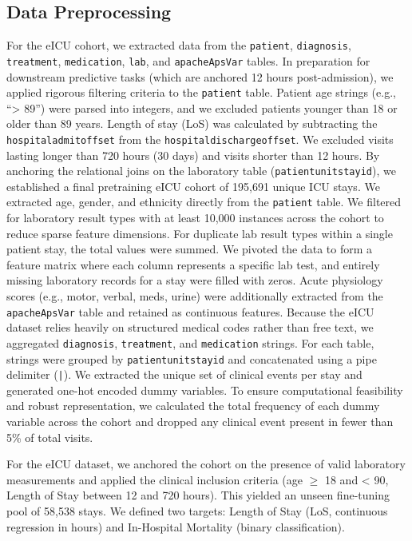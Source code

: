 \documentclass{article}
\begin{document}
\subsection{Data Preprocessing}
For the eICU cohort, we extracted data from the \texttt{patient}, \texttt{diagnosis}, \texttt{treatment}, \texttt{medication}, \texttt{lab}, and \texttt{apacheApsVar} tables. In preparation for downstream predictive tasks (which are anchored 12 hours post-admission), we applied rigorous filtering criteria to the \texttt{patient} table. Patient age strings (e.g., ``> 89'') were parsed into integers, and we excluded patients younger than 18 or older than 89 years. Length of stay (LoS) was calculated by subtracting the \texttt{hospitaladmitoffset} from the \texttt{hospitaldischargeoffset}. We excluded visits lasting longer than 720 hours (30 days) and visits shorter than 12 hours. By anchoring the relational joins on the laboratory table (\texttt{patientunitstayid}), we established a final pretraining eICU cohort of 195,691 unique ICU stays.
We extracted age, gender, and ethnicity directly from the \texttt{patient} table.
We filtered for laboratory result types with at least 10,000 instances across the cohort to reduce sparse feature dimensions. For duplicate lab result types within a single patient stay, the total values were summed. We pivoted the data to form a feature matrix where each column represents a specific lab test, and entirely missing laboratory records for a stay were filled with zeros. Acute physiology scores (e.g., motor, verbal, meds, urine) were additionally extracted from the \texttt{apacheApsVar} table and retained as continuous features.
Because the eICU dataset relies heavily on structured medical codes rather than free text, we aggregated \texttt{diagnosis}, \texttt{treatment}, and \texttt{medication} strings. For each table, strings were grouped by \texttt{patientunitstayid} and concatenated using a pipe delimiter (\texttt{|}). We extracted the unique set of clinical events per stay and generated one-hot encoded dummy variables. To ensure computational feasibility and robust representation, we calculated the total frequency of each dummy variable across the cohort and dropped any clinical event present in fewer than 5\% of total visits.

For the eICU dataset, we anchored the cohort on the presence of valid laboratory measurements and applied the clinical inclusion criteria (age $\ge$ 18 and < 90, Length of Stay between 12 and 720 hours). This yielded an unseen fine-tuning pool of 58,538 stays. We defined two targets: Length of Stay (LoS, continuous regression in hours) and In-Hospital Mortality (binary classification).
\end{document}
